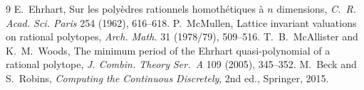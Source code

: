 \documentclass[11pt]{article}
\theoremstyle{definition}
\theoremstyle{remark}
\begin{document}
\begin{thebibliography}{9}
 E.~Ehrhart, Sur les poly\`edres rationnels homoth\'etiques \`a $n$ dimensions,
\emph{C.~R. Acad. Sci. Paris} 254 (1962), 616--618.
 P.~McMullen, Lattice invariant valuations on rational polytopes, \emph{Arch. Math.}
31 (1978/79), 509--516.
 T.~B.~McAllister and K.~M.~Woods, The minimum period of the Ehrhart quasi-polynomial of
a rational polytope, \emph{J. Combin. Theory Ser.~A} 109 (2005), 345--352.
 M.~Beck and S.~Robins, \emph{Computing the Continuous Discretely}, 2nd ed., Springer, 2015.
\end{thebibliography}
\end{document}
